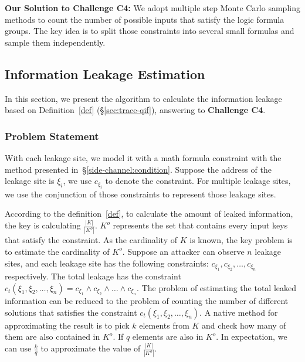 \vspace*{6pt}
\textbf{Our Solution to Challenge C4:}
We adopt multiple step Monte Carlo sampling methods to count the number of possible inputs
that satisfy the logic formula groups. The key idea is to  
 split those constraints into several small formulas and sample them independently.  

\subsection{Information Leakage Estimation}

\newcommand{\addr}[1]{{l}_{#1}}
\renewcommand{\addr}[1]{{\gamma}_{#1}}
\renewcommand{\addr}[1]{{\zeta}_{#1}}
\renewcommand{\addr}[1]{{\xi}_{#1}}

In this section, we present the algorithm to calculate the information
leakage based on Definition~\ref{def} (\S\ref{sec:trace-qif}), answering to
\textbf{Challenge C4}. 

\subsubsection{Problem Statement}
With each leakage site, we model it with a math formula constraint with the method 
presented in~\S\ref{side-channel:condition}.
Suppose the address of the leakage site is $\addr{i}$,
we use $c_{\addr{i}}$ to denote the constraint. For multiple leakage sites, 
we use the conjunction of those constraints to represent those leakage sites. 

According to the definition~\ref{def}, to calculate the amount of leaked 
information, the key is calculating $\frac{|K|}{|K^o|}$. $K^o$ represents
the set that contains every input keys that satisfy the constraint. As the 
cardinality of $K$ is known, the key problem is to estimate the cardinality of
$K^o$. Suppose an attacker can observe $n$ leakage sites, and each leakage site has
the following constraints: $c_{\addr{1}}, c_{\addr{2}}, \ldots, c_{\addr{n}}$ respectively. 
The total leakage has the constraint 
$c_t({\addr{1}},{\addr{2}},\ldots,{\addr{n}}) = c_{\addr{1}} \land c_{\addr{2}} 
\land \ldots \land c_{\addr{n}}$. The problem of estimating the total leaked information 
can be reduced to the problem of counting the number of different solutions 
that satisfies the constraint $c_t({\addr{1}},{\addr{2}},\ldots,{\addr{n}})$. 
A native method for approximating 
the result is to pick $k$ elements from $K$ and check how many of them are also
contained in $K^o$. If $q$ elements are also in $K^o$. In expectation, we can
use $\frac{k}{q}$ to approximate the value of $\frac{|K|}{|K^o|}$.

